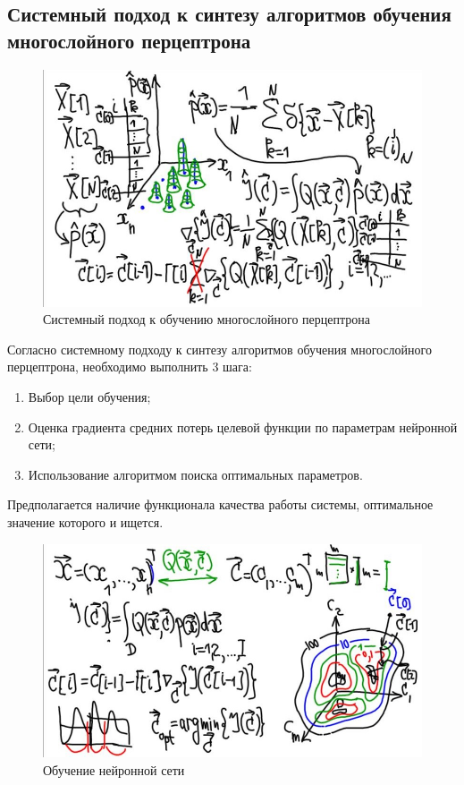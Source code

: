 \documentclass{article}
\begin{document}
\subsection{Системный подход к синтезу алгоритмов обучения многослойного перцептрона}

\begin{figure}[htbp]
    \centering
    \includegraphics[height=10 cm]{hyperflat_5_1.jpeg}
    \caption{Системный подход к обучению многослойного перцептрона}
    \label{hyperflat_5_1}
\end{figure}

Согласно системному подходу к синтезу алгоритмов обучения многослойного перцептрона, необходимо выполнить 3 шага:
\begin{enumerate}
    \item Выбор цели обучения;
    \item Оценка градиента средних потерь целевой функции по параметрам нейронной сети;
    \item Использование алгоритмом поиска оптимальных параметров.
\end{enumerate}

Предполагается наличие функционала качества работы системы, оптимальное значение которого и ищется.

\begin{figure}[htbp]
    \centering
    \includegraphics[height=8 cm]{hyperflat_4_1.jpeg}
    \caption{Обучение нейронной сети}
    \label{hyperflat_4_1}
\end{figure}
\end{document}
